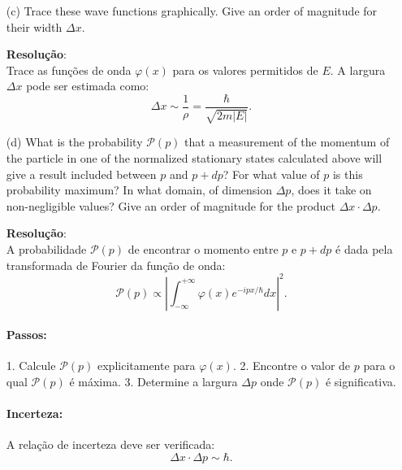 \documentclass[a4paper,12pt]{article}
\newcommand{\printingbibliography}{%

    \pagestyle{myheadings}
    \markright{}
    \sloppy
    \printbibliography[heading=bibintoc, %
                   title=Refer\^encias %
                  ]
    \fussy%
}
\begin{document}
\begin{enumerate}
    \item[(c)] Trace these wave functions graphically. Give an order of magnitude for their width \( \Delta x \).

    \textbf{Resolu\c{c}\~ao}:\\

    Trace as funções de onda \( \varphi(x) \) para os valores permitidos de \( E \). A largura \( \Delta x \) pode ser estimada como:
\[
\Delta x \sim \frac{1}{\rho} = \frac{\hbar}{\sqrt{2m|E|}}.
\]
    
    \item[(d)] What is the probability \( \mathcal{P}(p) \) that a measurement of the momentum of the particle in one of the normalized stationary states calculated above will give a result included between \( p \) and \( p + dp \)? For what value of \( p \) is this probability maximum? In what domain, of dimension \( \Delta p \), does it take on non-negligible values? Give an order of magnitude for the product \( \Delta x \cdot \Delta p \).

    \textbf{Resolu\c{c}\~ao}:\\

    A probabilidade \( \mathcal{P}(p) \) de encontrar o momento entre \( p \) e \( p + dp \) é dada pela transformada de Fourier da função de onda:
\[
\mathcal{P}(p) \propto \left| \int_{-\infty}^{+\infty} \varphi(x) e^{-ipx/\hbar} dx \right|^2.
\]

\paragraph{Passos:}
1. Calcule \( \mathcal{P}(p) \) explicitamente para \( \varphi(x) \).
2. Encontre o valor de \( p \) para o qual \( \mathcal{P}(p) \) é máxima.
3. Determine a largura \( \Delta p \) onde \( \mathcal{P}(p) \) é significativa.

\paragraph{Incerteza:}
A relação de incerteza deve ser verificada:
\[
\Delta x \cdot \Delta p \sim \hbar.
\]
    
\end{enumerate}







\end{document}

